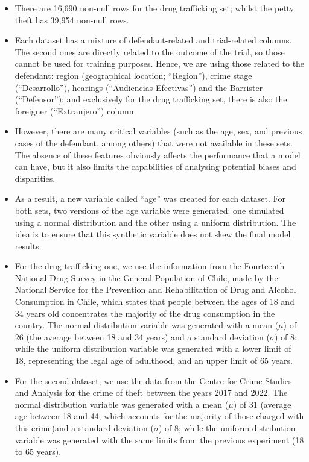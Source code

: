 \documentclass[twoside,11pt]{article}
\begin{document}
    \begin{itemize}
        \item There are 16,690 non-null rows for the drug trafficking set; whilst the petty theft has 39,954 non-null rows.
        
        \item Each dataset has a mixture of defendant-related and trial-related columns. The second ones are directly related to the outcome of the trial, so those cannot be used for training purposes. Hence, we are using those related to the defendant: region (geographical location; ``Region''), crime stage (``Desarrollo''), hearings (``Audiencias Efectivas'') and the Barrister (``Defensor''); and exclusively for the drug trafficking set, there is also the foreigner (``Extranjero'') column.  
        
        \item However, there are many critical variables (such as the age, sex, and previous cases of the defendant, among others) that were not available in these sets. The absence of these features obviously affects the performance that a model can have, but it also limits the capabilities of analysing potential biases and disparities. 
        
        \item As a result, a new variable called ``age'' was created for each dataset. For both sets, two versions of the age variable were generated: one simulated using a normal distribution and the other using a uniform distribution. The idea is to ensure that this synthetic variable does not skew the final model results.
        
        \item For the drug trafficking one, we use the information from the Fourteenth National Drug Survey in the General Population of Chile, made by the National Service for the Prevention and Rehabilitation of Drug and Alcohol Consumption  in Chile, which states that people between the ages of 18 and 34 years old concentrates the majority of the drug consumption in the country. The normal distribution variable was generated with a mean ($\mu$) of 26 (the average between 18 and 34 years) and a standard deviation ($\sigma$) of 8; while the uniform distribution variable was generated with a lower limit of 18, representing the legal age of adulthood, and an upper limit of 65 years. 
        
        \item For the second dataset, we use the data from the Centre for Crime Studies and Analysis  for the crime of theft between the years 2017 and 2022. The normal distribution variable was generated with a mean ($\mu$) of 31 (average age between 18 and 44, which accounts for the majority of those charged with this crime)and a standard deviation ($\sigma$) of 8; while the uniform distribution variable was generated with the same limits from the previous experiment (18 to 65 years). 
        

\end{itemize}
\end{document}
